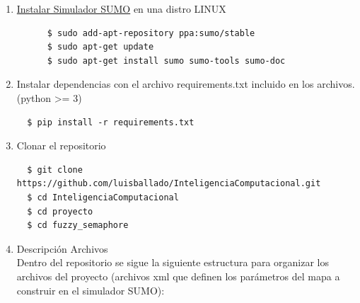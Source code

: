 \documentclass{article}
\begin{document}
\begin{enumerate} 

\item \href{https://sumo.dlr.de/docs/Downloads.php}{Instalar Simulador SUMO} en una distro LINUX

  \begin{commandline}
    \begin{verbatim}
      $ sudo add-apt-repository ppa:sumo/stable
      $ sudo apt-get update
      $ sudo apt-get install sumo sumo-tools sumo-doc
    \end{verbatim}
 \end{commandline}
  
\item Instalar dependencias con el archivo requirements.txt incluido en los archivos. (python >= 3)
  \begin{commandline}
 \begin{verbatim}
  $ pip install -r requirements.txt
  \end{verbatim}
 \end{commandline}
  
\item Clonar el repositorio
  
\begin{commandline}
 \begin{verbatim}
  $ git clone https://github.com/luisballado/InteligenciaComputacional.git
  $ cd InteligenciaComputacional
  $ cd proyecto
  $ cd fuzzy_semaphore
 \end{verbatim}
\end{commandline}

\newpage
\item Descripción Archivos \\

  Dentro del repositorio se sigue la siguiente estructura para organizar los archivos del proyecto (archivos xml que definen los parámetros del mapa a construir en el simulador SUMO):\\
  

\end{enumerate} 
\end{document}
